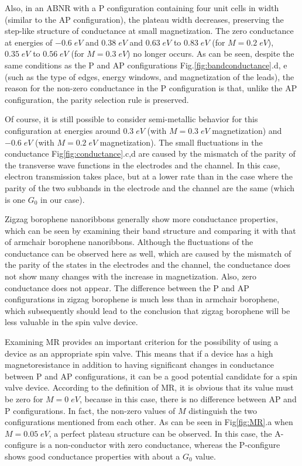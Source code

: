 \documentclass[twoside,twocolumn,9pt]{article}
\begin{document}
Also, in an ABNR with a P configuration containing four unit cells in width (similar to the AP configuration), the plateau width decreases, preserving the step-like structure of conductance at small magnetization. The zero conductance at energies of $-0.6\;eV$ and $0.38\;eV$ and $0.63\;eV$ to $0.83\;eV$ (for $M = 0.2\;eV$), $0.35\;eV$ to $0.56\;eV$ (for $M = 0.3\;eV$) no longer occurs. As can be seen, despite the same conditions as the P and AP configurations Fig.\ref{fig:bandconductance}.d, e (such as the type of edges, energy windows, and magnetization of the leads), the reason for the non-zero conductance in the P configuration is that, unlike the AP configuration, the parity selection rule is preserved.

Of course, it is still possible to consider semi-metallic behavior for this configuration at energies around $0.3\;eV$ (with $M = 0.3\;eV$ magnetization) and $-0.6\;eV$ (with $M = 0.2\;eV$ magnetization). The small fluctuations in the conductance Fig\ref{fig:conductance}.c,d are caused by the mismatch of the parity of the transverse wave functions in the electrodes and the channel. In this case, electron transmission takes place, but at a lower rate than in the case where the parity of the two subbands in the electrode and the channel are the same (which is one $G_0$ in our case).

Zigzag borophene nanoribbons generally show more conductance properties, which can be seen by examining their band structure and comparing it with that of armchair borophene nanoribbons. Although the fluctuations of the conductance can be observed here as well, which are caused by the mismatch of the parity of the states in the electrodes and the channel, the conductance does not show many changes with the increase in magnetization. Also, zero conductance does not appear. The difference between the P and AP configurations in zigzag borophene is much less than in armchair borophene, which subsequently should lead to the conclusion that zigzag borophene will be less valuable in the spin valve device.

Examining MR provides an important criterion for the possibility of using a device as an appropriate spin valve. This means that if a device has a high magnetoresistance in addition to having significant changes in conductance between P and AP configurations, it can be a good potential candidate for a spin valve device. According to the definition of MR, it is obvious that its value must be zero for $M = 0\;eV$, because in this case, there is no difference between AP and P configurations. In fact, the non-zero values of $M$ distinguish the two configurations mentioned from each other. As can be seen in Fig\ref{fig:MR}.a when $M=0.05\;eV$, a perfect plateau structure can be observed. In this case, the A-configure is a non-conductor with zero conductance, whereas the P-configure shows good conductance properties with about a $G_0$ value.
\end{document}
